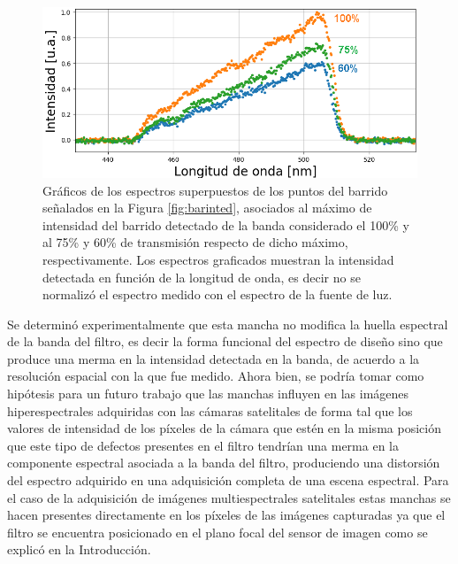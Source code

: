  \begin{figure}
	\centering
	\includegraphics[width=1.0\textwidth]{Figs/microespectrometro/variacionintensidaddefecto.png}
	\caption{Gráficos de los espectros superpuestos de los puntos del barrido señalados en la Figura \ref{fig:barinted}, asociados al máximo de intensidad del barrido detectado de la banda considerado el 100\% y al 75\% y 60\% de transmisión respecto de dicho máximo, respectivamente. Los espectros graficados muestran la intensidad detectada en función de la longitud de onda, es decir no se normalizó el espectro medido con el espectro de la fuente de luz.}
	\label{fig:merrmmin}
\end{figure}

Se determinó experimentalmente que esta mancha no modifica la huella espectral de la banda del filtro, es decir la forma funcional del espectro de diseño sino que produce una merma en la intensidad detectada en la banda, de acuerdo a la resolución espacial con la que fue medido. Ahora bien, se podría tomar como hipótesis para un futuro trabajo que las manchas influyen en las imágenes hiperespectrales adquiridas con las cámaras satelitales de forma tal que los valores de intensidad de los píxeles de la cámara que estén en la misma posición que este tipo de defectos presentes en el filtro tendrían una merma en la componente espectral asociada a la banda del filtro, produciendo una distorsión del espectro adquirido en una adquisición completa de una escena espectral. Para el caso de la adquisición de imágenes multiespectrales satelitales estas manchas se hacen presentes directamente en los píxeles de las imágenes capturadas ya que el filtro se encuentra posicionado en el plano focal del sensor de imagen como se explicó en la Introducción.


